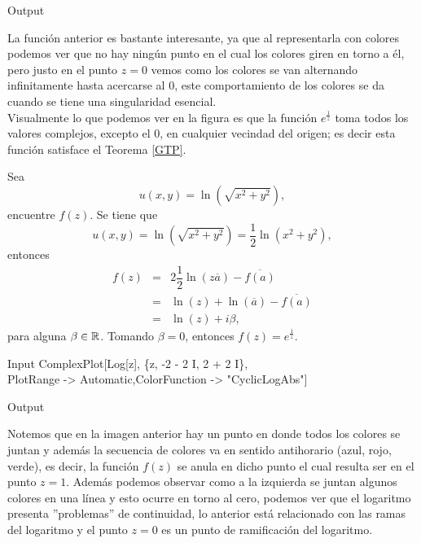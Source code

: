 \begin{Ejem}
	\begin{mmaCell}[moregraphics={moreig={scale=.25}}]{Output}
	\end{mmaCell}
La función anterior es bastante interesante, ya que al representarla con colores podemos ver que no hay ningún punto en el cual los colores giren en torno a él, pero justo en el punto $z=0$ vemos como los colores se van alternando infinitamente hasta acercarse  al $0$, este comportamiento de los colores se da cuando se tiene una singularidad esencial.\\
Visualmente lo que podemos ver en la figura es que la función $e^{\frac{1}{z}}$ toma todos los valores complejos, excepto el $0$, en cualquier vecindad del origen; es decir esta función satisface el Teorema \ref{GTP}.\endproof
\end{Ejem}


\begin{Ejem}
	Sea $$u(x,y)=\ln(\sqrt{x^2+y^2}),$$  encuentre $f(z)$.
	\solu
	Se tiene que $$u(x,y)=\ln(\sqrt{x^2+y^2})=\dfrac{1}{2}\ln(x^2+y^2),$$
	entonces 
	\[
		\begin{array}{ccl}
			f(z)&=&2\dfrac{1}{2}\ln(z\overline{a})-\overline{f(a)}\\
			&=&\ln(z)+\ln(\overline{a})-\overline{f(a)}\\
			&=&\ln(z)+i\beta,
		\end{array}
	\]
	para alguna $\beta\in \mathbb{R}$.
	Tomando $\beta=0$, entonces $f(z)=e^{\frac{1}{z}}$.
	\begin{mmaCell}{Input}
		ComplexPlot[Log[z], \{z, -2 - 2 I, 2 + 2 I\},\\PlotRange -> Automatic,ColorFunction -> "CyclicLogAbs"]
	\end{mmaCell}
	
	\begin{mmaCell}[moregraphics={moreig={scale=.25}}]{Output}
	\end{mmaCell}
\end{Ejem}
Notemos que en la imagen anterior hay un punto en donde todos los colores se juntan y además la secuencia de colores va en sentido antihorario (azul, rojo, verde), es decir, la función $f(z)$ se anula en dicho punto el cual resulta ser en el punto $z=1$. Además podemos observar como a la izquierda se juntan algunos colores en una línea  y esto ocurre en torno al cero, podemos ver que el logaritmo presenta ''problemas'' de continuidad, lo anterior está relacionado con las ramas del logaritmo y el punto $z=0$ es un punto de ramificación del logaritmo.\endproof

